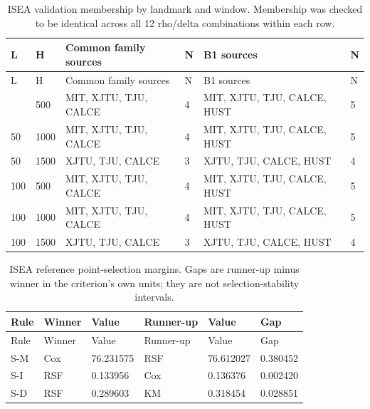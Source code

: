 \documentclass[10pt,a4paper]{article}
\begin{document}
{\scriptsize
\begin{longtable}{@{\extracolsep{\fill}}llllll}
\caption{ISEA validation membership by landmark and window. Membership was checked to be identical across all 12 rho/delta combinations within each row.}\label{tab:window_support}\\
\toprule
L & H & Common family sources & N & B1 sources & N\\\midrule
\endfirsthead
\toprule
L & H & Common family sources & N & B1 sources & N\\\midrule
\endhead
\bottomrule\endfoot
50 & 500 & MIT, XJTU, TJU, CALCE & 4 & MIT, XJTU, TJU, CALCE, HUST & 5\\
50 & 1000 & MIT, XJTU, TJU, CALCE & 4 & MIT, XJTU, TJU, CALCE, HUST & 5\\
50 & 1500 & XJTU, TJU, CALCE & 3 & XJTU, TJU, CALCE, HUST & 4\\
100 & 500 & MIT, XJTU, TJU, CALCE & 4 & MIT, XJTU, TJU, CALCE, HUST & 5\\
100 & 1000 & MIT, XJTU, TJU, CALCE & 4 & MIT, XJTU, TJU, CALCE, HUST & 5\\
100 & 1500 & XJTU, TJU, CALCE & 3 & XJTU, TJU, CALCE, HUST & 4\\
\end{longtable}}
{\scriptsize
\begin{longtable}{@{\extracolsep{\fill}}llllll}
\caption{ISEA reference point-selection margins. Gaps are runner-up minus winner in the criterion's own units; they are not selection-stability intervals.}\label{tab:selection_margins}\\
\toprule
Rule & Winner & Value & Runner-up & Value & Gap\\\midrule
\endfirsthead
\toprule
Rule & Winner & Value & Runner-up & Value & Gap\\\midrule
\endhead
\bottomrule\endfoot
S-M & Cox & 76.231575 & RSF & 76.612027 & 0.380452\\
S-I & RSF & 0.133956 & Cox & 0.136376 & 0.002420\\
S-D & RSF & 0.289603 & KM & 0.318454 & 0.028851\\
\end{longtable}}
\end{document}
